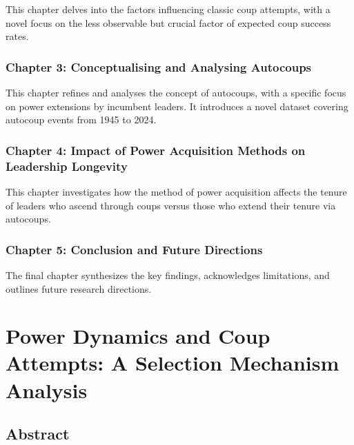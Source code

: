 \documentclass[
  12pt,
]{report}
\begin{document}
This chapter delves into the factors influencing classic coup attempts,
with a novel focus on the less observable but crucial factor of expected
coup success rates.

\subsection*{Chapter 3: Conceptualising and Analysing
Autocoups}\label{chapter-3-conceptualising-and-analysing-autocoups}

This chapter refines and analyses the concept of autocoups, with a
specific focus on power extensions by incumbent leaders. It introduces a
novel dataset covering autocoup events from 1945 to 2024.

\subsection*{Chapter 4: Impact of Power Acquisition Methods on
Leadership
Longevity}\label{chapter-4-impact-of-power-acquisition-methods-on-leadership-longevity}

This chapter investigates how the method of power acquisition affects
the tenure of leaders who ascend through coups versus those who extend
their tenure via autocoups.

\subsection*{Chapter 5: Conclusion and Future
Directions}\label{chapter-5-conclusion-and-future-directions}

The final chapter synthesizes the key findings, acknowledges
limitations, and outlines future research directions.

\chapter{Power Dynamics and Coup Attempts: A Selection Mechanism
Analysis}\label{sec-chapter2}

\section*{Abstract}\label{abstract-1}
\end{document}
